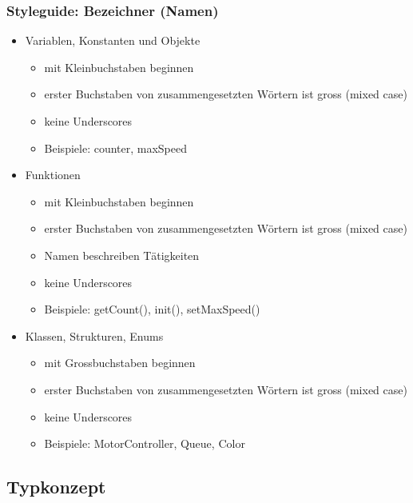 \subsubsection{Styleguide: Bezeichner (\raisebox{-0.9ex}{\~{ }}Namen)\hfill}
\label{sec:unterunterabschnitt}
\begin{itemize}
	\item Variablen, Konstanten und Objekte
	\begin{itemize}
		\item mit Kleinbuchstaben beginnen
		\item erster Buchstaben von zusammengesetzten Wörtern ist gross (mixed case)
		\item keine Underscores
		\\
		\item[\-] Beispiele: counter, maxSpeed
		\\
	\end{itemize}
	\item Funktionen
	\begin{itemize}
		\item mit Kleinbuchstaben beginnen
		\item erster Buchstaben von zusammengesetzten Wörtern ist gross (mixed case)
		\item Namen beschreiben Tätigkeiten
		\item keine Underscores
		\\
		\item[\-] Beispiele: getCount(), init(), setMaxSpeed()
		\\
	\end{itemize}
	\item Klassen, Strukturen, Enums
	\begin{itemize}
		\item mit Grossbuchstaben beginnen
		\item erster Buchstaben von zusammengesetzten Wörtern ist gross (mixed case)
		\item keine Underscores
		\\
		\item[\-] Beispiele: MotorController, Queue, Color
	\end{itemize}
\end{itemize}

\subsection{Typkonzept\hfill}
\label{sec:unterabschnitt}

